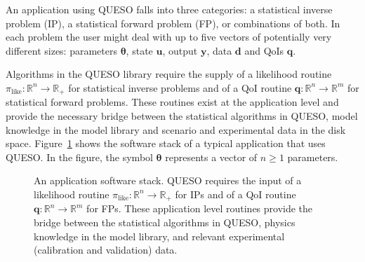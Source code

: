 An application using QUESO falls into three categories: a statistical inverse problem (IP), a statistical forward problem (FP), or combinations of both.
In each problem the user might deal with up to five vectors of potentially very different sizes:
parameters $\boldsymbol{\theta}$, state $\mathbf{u}$, output $\mathbf{y}$, data $\mathbf{d}$ and QoIs $\mathbf{q}$.

Algorithms in the QUESO library require the supply
of a likelihood routine $\pi_{\text{like}}:\mathbb{R}^n\rightarrow\mathbb{R}_+$ for statistical inverse problems and 
of a QoI routine $\mathbf{q}:\mathbb{R}^n\rightarrow\mathbb{R}^m$ for statistical forward problems. These routines
exist at the application level and provide the necessary bridge between the statistical algorithms in QUESO,
model knowledge in the model library and scenario and experimental data in the disk space.
%
Figure~\ref{fig-sw-stack} shows the software stack of a typical application that uses QUESO. In the figure, the symbol $\boldsymbol{\theta}$ represents a vector of $n\geqslant 1$ parameters. 
%
\begin{figure}[!htbp]
\centerline{
}
\caption{
An application software stack.
QUESO requires the input
of a likelihood routine $\pi_{\text{like}}:\mathbb{R}^n\rightarrow\mathbb{R}_+$ for IPs and 
of a QoI routine $\mathbf{q}:\mathbb{R}^n\rightarrow\mathbb{R}^m$ for FPs.
These application level routines provide the bridge between
the statistical algorithms in QUESO,
physics 
knowledge in the model library, and relevant 
experimental (calibration
    and validation) data.
}
\label{fig-sw-stack}
\end{figure}


